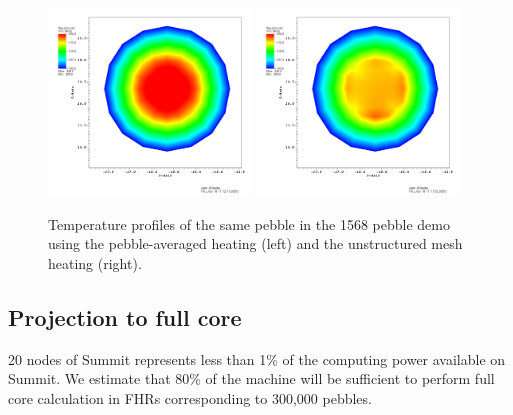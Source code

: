 \begin{figure}[!h]
\centering
\includegraphics[clip=true,width=0.48\textwidth]{Figures/openmc_cell_temperature_zoomed}
\includegraphics[clip=true,width=0.48\textwidth]{Figures/openmc_mesh_temperature_zoomed}
\caption{Temperature profiles of the same pebble in the 1568 pebble demo using the pebble-averaged heating (left) and the unstructured mesh heating (right).}
\label{f:1568_openmc_temperatures_single_pebble}
\end{figure}

\subsection{Projection to full core}

20 nodes of Summit represents less than 1\% of the computing power available on Summit. We estimate that 80\% of the machine will be sufficient to perform full core calculation in FHRs corresponding to 300,000 pebbles.
